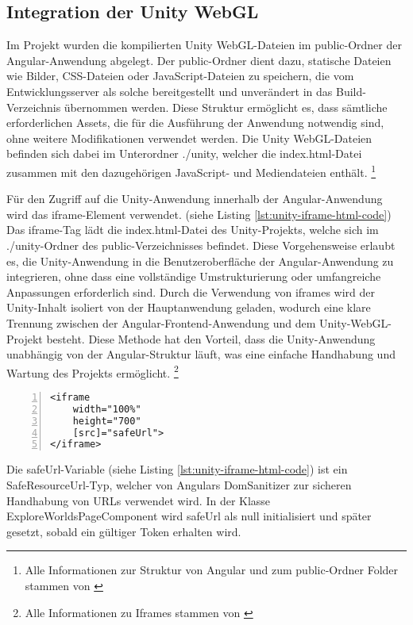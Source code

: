 \subsection{Integration der Unity WebGL}
\label{sec:frontend-integration-webgl}

Im Projekt wurden die kompilierten Unity WebGL-Dateien im public-Ordner der Angular-Anwendung abgelegt. Der 
public-Ordner dient dazu, statische Dateien wie Bilder, CSS-Dateien oder JavaScript-Dateien zu speichern, 
die vom Entwicklungsserver als solche bereitgestellt und unverändert in das Build-Verzeichnis übernommen werden. 
Diese Struktur ermöglicht es, dass sämtliche erforderlichen Assets, die für die Ausführung der Anwendung notwendig 
sind, ohne weitere Modifikationen verwendet werden. Die Unity WebGL-Dateien befinden sich dabei im Unterordner 
./unity, welcher die index.html-Datei zusammen mit den dazugehörigen JavaScript- und Mediendateien enthält.
\footnote{Alle Informationen zur Struktur von Angular und zum public-Ordner Folder stammen von \cite{Google}}

Für den Zugriff auf die Unity-Anwendung innerhalb der Angular-Anwendung wird das iframe-Element verwendet. (siehe Listing \ref{lst:unity-iframe-html-code}) 
Das iframe-Tag lädt die index.html-Datei des Unity-Projekts, welche sich im ./unity-Ordner des public-Verzeichnisses 
befindet. Diese Vorgehensweise erlaubt es, die Unity-Anwendung in die Benutzeroberfläche der Angular-Anwendung zu 
integrieren, ohne dass eine vollständige Umstrukturierung oder umfangreiche Anpassungen erforderlich sind. Durch 
die Verwendung von iframes wird der Unity-Inhalt isoliert von der Hauptanwendung geladen, wodurch eine klare 
Trennung zwischen der Angular-Frontend-Anwendung und dem Unity-WebGL-Projekt besteht. Diese Methode hat den 
Vorteil, dass die Unity-Anwendung unabhängig von der Angular-Struktur läuft, was eine einfache Handhabung und 
Wartung des Projekts ermöglicht.
\footnote{Alle Informationen zu Iframes stammen von \cite{MozillaFoundationb}}

\begin{lstlisting}[numbers=left,caption={Iframe-Zugriff auf Unity},label={lst:unity-iframe-html-code}]
<iframe
    width="100%"
    height="700"
    [src]="safeUrl">
</iframe>
\end{lstlisting}

Die safeUrl-Variable (siehe Listing \ref{lst:unity-iframe-html-code}) ist ein SafeResourceUrl-Typ, 
welcher von Angulars DomSanitizer zur sicheren Handhabung von URLs verwendet wird. In der Klasse 
ExploreWorldsPageComponent wird safeUrl als null initialisiert und später gesetzt, sobald ein 
gültiger Token erhalten wird.

